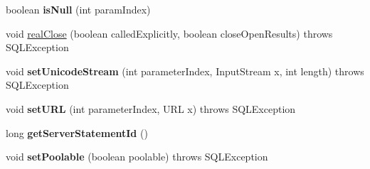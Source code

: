 \begin{DoxyCompactItemize}
boolean {\bfseries is\+Null} (int param\+Index)
\item 
void \mbox{\hyperlink{classcom_1_1mysql_1_1cj_1_1jdbc_1_1_server_prepared_statement_a1bc3e61ca02b73fbbdcc74c8528b41eb}{real\+Close}} (boolean called\+Explicitly, boolean close\+Open\+Results)  throws S\+Q\+L\+Exception 
\item 
\mbox{\label{classcom_1_1mysql_1_1cj_1_1jdbc_1_1_server_prepared_statement_a514b9066383c6b783ce5c7db9cd43e0f}} 
void {\bfseries set\+Unicode\+Stream} (int parameter\+Index, Input\+Stream x, int length)  throws S\+Q\+L\+Exception 
\item 
\mbox{\label{classcom_1_1mysql_1_1cj_1_1jdbc_1_1_server_prepared_statement_a6ce630e098838eb3f9184c7dc2673c59}} 
void {\bfseries set\+U\+RL} (int parameter\+Index, U\+RL x)  throws S\+Q\+L\+Exception 
\item 
\mbox{\label{classcom_1_1mysql_1_1cj_1_1jdbc_1_1_server_prepared_statement_a62521a9884c5d55a8853b0397e89968b}} 
long {\bfseries get\+Server\+Statement\+Id} ()
\item 
\mbox{\label{classcom_1_1mysql_1_1cj_1_1jdbc_1_1_server_prepared_statement_a30b4b80c8969b8f8d99f39cfe9df753f}} 
void {\bfseries set\+Poolable} (boolean poolable)  throws S\+Q\+L\+Exception 
\end{DoxyCompactItemize}
